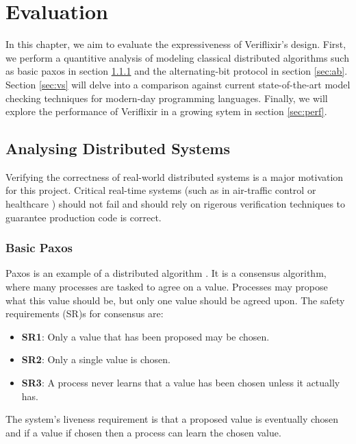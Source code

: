 \chapter{Evaluation}
In this chapter, we aim to evaluate the expressiveness of Veriflixir's design. First, we perform a quantitive analysis of modeling classical distributed algorithms such as basic paxos in section \ref{sec:paxos} and the alternating-bit protocol in section \ref{sec:ab}. Section \ref{sec:vs} will delve into a comparison against current state-of-the-art model checking techniques for modern-day programming languages. Finally, we will explore the performance of Veriflixir in a growing sytem in section \ref{sec:perf}.
\section{Analysing Distributed Systems}
Verifying the correctness of real-world distributed systems is a major motivation for this project. Critical real-time systems (such as in air-traffic control or healthcare  \cite{airlines,healthcare}) should not fail and should rely on rigerous verification techniques to guarantee production code is correct.  
\subsection{Basic Paxos} \label{sec:paxos}
Paxos is an example of a distributed algorithm \cite{paxos_simple}. It is a consensus algorithm, where many processes are tasked to agree on a value. Processes may propose what this value should be, but only one value should be agreed upon. The safety requirements (SR)s for consensus are:
\begin{itemize}
    \item \textbf{SR1}: Only a value that has been proposed may be chosen.
    \item \textbf{SR2}: Only a single value is chosen.
    \item \textbf{SR3}: A process never learns that a value has been chosen unless it actually has.
\end{itemize}
The system's liveness requirement is that a proposed value is eventually chosen and if a value if chosen then a process can learn the chosen value.
